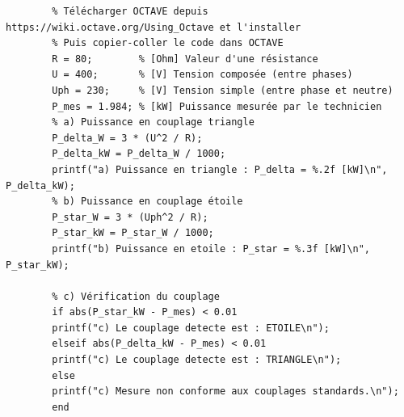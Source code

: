 \documentclass[a4paper,11pt,answers,addpoints]{exam}
\begin{document}
\begin{questions}
\begin{solution}
	\begin{verbatim}
		% Télécharger OCTAVE depuis https://wiki.octave.org/Using_Octave et l'installer
		% Puis copier-coller le code dans OCTAVE
		R = 80;        % [Ohm] Valeur d'une résistance
		U = 400;       % [V] Tension composée (entre phases)
		Uph = 230;     % [V] Tension simple (entre phase et neutre)
		P_mes = 1.984; % [kW] Puissance mesurée par le technicien
		% a) Puissance en couplage triangle
		P_delta_W = 3 * (U^2 / R);
		P_delta_kW = P_delta_W / 1000;
		printf("a) Puissance en triangle : P_delta = %.2f [kW]\n", P_delta_kW);
		% b) Puissance en couplage étoile
		P_star_W = 3 * (Uph^2 / R);
		P_star_kW = P_star_W / 1000;
		printf("b) Puissance en etoile : P_star = %.3f [kW]\n", P_star_kW);
		
		% c) Vérification du couplage
		if abs(P_star_kW - P_mes) < 0.01
		printf("c) Le couplage detecte est : ETOILE\n");
		elseif abs(P_delta_kW - P_mes) < 0.01
		printf("c) Le couplage detecte est : TRIANGLE\n");
		else
		printf("c) Mesure non conforme aux couplages standards.\n");
		end
	\end{verbatim}
	\end{solution}
\end{questions}
\end{document}
